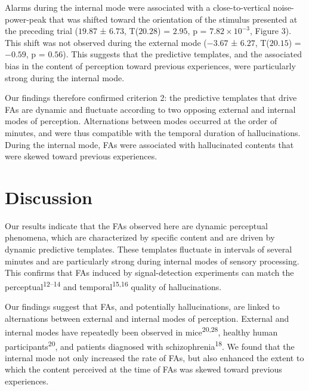 \documentclass[
]{article}
\begin{document}
Alarms during the internal mode were associated with a close-to-vertical
noise-power-peak that was shifted toward the orientation of the stimulus
presented at the preceding trial (\(19.87\) ± \(6.73\), T(\(20.28\)) =
\(2.95\), p = \(\ensuremath{7.82\times 10^{-3}}\), Figure 3). This shift
was not observed during the external mode (\(-3.67\) ± \(6.27\),
T(\(20.15\)) = \(-0.59\), p = \(0.56\)). This suggests that the
predictive templates, and the associated bias in the content of
perception toward previous experiences, were particularly strong during
the internal mode.

Our findings therefore confirmed criterion 2: the predictive templates
that drive FAs are dynamic and fluctuate according to two opposing
external and internal modes of perception. Alternations between modes
occurred at the order of minutes, and were thus compatible with the
temporal duration of hallucinations. During the internal mode, FAs were
associated with hallucinated contents that were skewed toward previous
experiences.

\hypertarget{discussion}{%
\section{Discussion}\label{discussion}}

Our results indicate that the FAs observed here are dynamic perceptual
phenomena, which are characterized by specific content and are driven by
dynamic predictive templates. These templates fluctuate in intervals of
several minutes and are particularly strong during internal modes of
sensory processing. This confirms that FAs induced by signal-detection
experiments can match the perceptual\textsuperscript{12--14} and
temporal\textsuperscript{15,16} quality of hallucinations.

Our findings suggest that FAs, and potentially hallucinations, are
linked to alternations between external and internal modes of
perception. External and internal modes have repeatedly been observed in
mice\textsuperscript{20,28}, healthy human
participants\textsuperscript{20}, and patients diagnosed with
schizophrenia\textsuperscript{18}. We found that the internal mode not
only increased the rate of FAs, but also enhanced the extent to which
the content perceived at the time of FAs was skewed toward previous
experiences.
\end{document}
